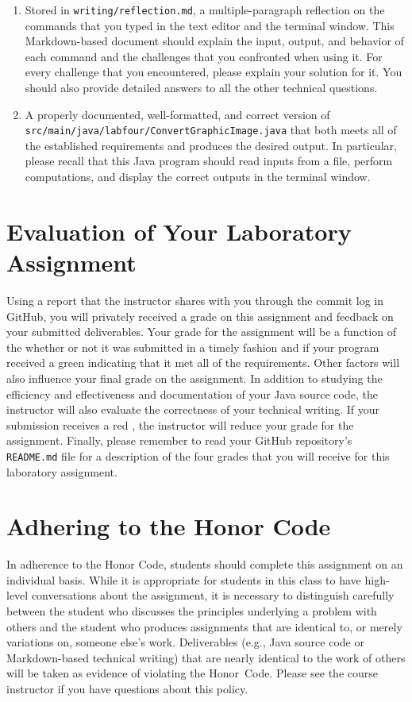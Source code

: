 \documentclass[11pt]{article}
\newcommand{\mainprogramsource}{\lstinline{src/main/java/labfour/ConvertGraphicImage.java}}
\newcommand{\reflection}{\lstinline{writing/reflection.md}}
\newcommand{\program}[1]{\lstinline{#1}}
\newcommand{\checkmark}{\ding{51}}
\newcommand{\naughtmark}{\ding{55}}
\begin{document}
\begin{enumerate}

  \setlength{\itemsep}{0in}

\item Stored in \reflection{}, a multiple-paragraph reflection on the commands
  that you typed in the text editor and the terminal window. This Markdown-based
  document should explain the input, output, and behavior of each command and
  the challenges that you confronted when using it. For every challenge that you
  encountered, please explain your solution for it. You should also provide
  detailed answers to all the other technical questions.

\item A properly documented, well-formatted, and correct version of
  \mainprogramsource{} that both meets all of the established requirements and
  produces the desired output. In particular, please recall that this Java
  program should read inputs from a file, perform computations, and display the
  correct outputs in the terminal window.

\end{enumerate}

\section*{Evaluation of Your Laboratory Assignment}

Using a report that the instructor shares with you through the commit log in
GitHub, you will privately received a grade on this assignment and feedback on
your submitted deliverables. Your grade for the assignment will be a function of
the whether or not it was submitted in a timely fashion and if your program
received a green \checkmark{} indicating that it met all of the requirements.
Other factors will also influence your final grade on the assignment. In
addition to studying the efficiency and effectiveness and documentation of your
Java source code, the instructor will also evaluate the correctness of your
technical writing. If your submission receives a red \naughtmark{}, the
instructor will reduce your grade for the assignment. Finally, please remember
to read your GitHub repository's \program{README.md} file for a description of
the four grades that you will receive for this laboratory assignment.

\section*{Adhering to the Honor Code}

In adherence to the Honor Code, students should complete this assignment on an
individual basis. While it is appropriate for students in this class to have
high-level conversations about the assignment, it is necessary to distinguish
carefully between the student who discusses the principles underlying a problem
with others and the student who produces assignments that are identical to, or
merely variations on, someone else's work. Deliverables (e.g., Java source code
or Markdown-based technical writing) that are nearly identical to the work of
others will be taken as evidence of violating the \mbox{Honor Code}. Please see
the course instructor if you have questions about this policy.
\end{document}

